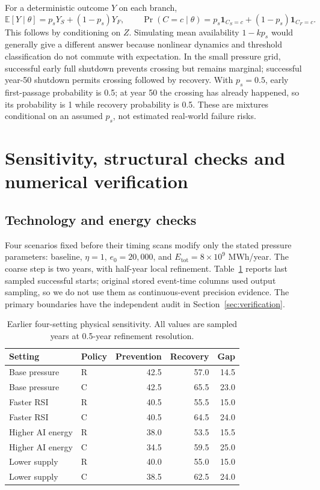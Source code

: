 \documentclass[12pt,a4paper]{article}
\theoremstyle{remark}
\newcommand{\ind}{\mathbf{1}}
\newcommand{\Etotal}{E_{\mathrm{tot}}}
\begin{document}
For a deterministic outcome $Y$ on each branch,
\begin{equation}
\mathbb E[Y\mid\theta]=p_sY_S+(1-p_s)Y_F,\qquad
\Pr(C=c\mid\theta)=p_s\ind_{C_S=c}+(1-p_s)\ind_{C_F=c}.
\end{equation}
This follows by conditioning on $Z$. Simulating mean availability $1-kp_s$ would generally give a different answer because nonlinear dynamics and threshold classification do not commute with expectation. In the small pressure grid, successful early full shutdown prevents crossing but remains marginal; successful year-50 shutdown permits crossing followed by recovery. With $p_s=0.5$, early first-passage probability is 0.5; at year 50 the crossing has already happened, so its probability is 1 while recovery probability is 0.5. These are mixtures conditional on an assumed $p_s$, not estimated real-world failure risks.

\section{Sensitivity, structural checks and numerical verification}\label{sec:sensitivity}
\subsection{Technology and energy checks}
Four scenarios fixed before their timing scans modify only the stated pressure parameters: baseline, $\eta=1$, $e_0=20,000$, and $\Etotal=8\times10^9$ MWh/year. The coarse step is two years, with half-year local refinement. Table~\ref{tab:physicalchecks} reports last sampled successful starts; original stored event-time columns used output sampling, so we do not use them as continuous-event precision evidence. The primary boundaries have the independent audit in Section~\ref{sec:verification}.

\begin{table}[htbp]\centering\small
\caption{Earlier four-setting physical sensitivity. All values are sampled years at 0.5-year refinement resolution.}\label{tab:physicalchecks}
\begin{tabular}{@{}llrrr@{}}\toprule
Setting & Policy & Prevention & Recovery & Gap\\\midrule
Base pressure & R & 42.5 & 57.0 & 14.5\\
Base pressure & C & 42.5 & 65.5 & 23.0\\
Faster RSI & R & 40.5 & 55.5 & 15.0\\
Faster RSI & C & 40.5 & 64.5 & 24.0\\
Higher AI energy & R & 38.0 & 53.5 & 15.5\\
Higher AI energy & C & 34.5 & 59.5 & 25.0\\
Lower supply & R & 40.0 & 55.0 & 15.0\\
Lower supply & C & 38.5 & 62.5 & 24.0\\
\bottomrule\end{tabular}

\end{table}
\end{document}
